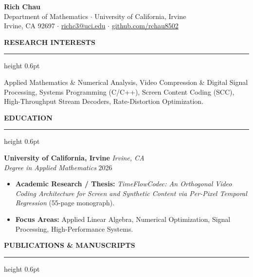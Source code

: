 \documentclass[11pt,letterpaper]{article}
\newcommand{\cvsection}[1]{%
  \vspace{10pt}%
  {\noindent\large\bfseries\MakeUppercase{#1}}\\[-2pt]%
  \hrule height 0.6pt%
  \vspace{5pt}%
}
\newcommand{\cventry}[4]{%
  \textbf{#1} \hfill \textit{#2} \\
  \textit{#3} \hfill #4 \\
}
\begin{document}
\begin{center}
    {\Huge \textbf{Rich Chau}} \\[6pt]
    Department of Mathematics $\cdot$ University of California, Irvine \\
    Irvine, CA 92697 $\cdot$ \href{mailto:richc3@uci.edu}{richc3@uci.edu} $\cdot$ \href{https://github.com/rchau8502}{github.com/rchau8502}
\end{center}

\vspace{4pt}

\cvsection{Research Interests}
Applied Mathematics \& Numerical Analysis, Video Compression \& Digital Signal Processing, Systems Programming (C/C++), Screen Content Coding (SCC), High-Throughput Stream Decoders, Rate-Distortion Optimization.

\cvsection{Education}

\cventry{University of California, Irvine}{Irvine, CA}{Degree in Applied Mathematics}{2026}
\begin{itemize}
    \setlength{\itemsep}{1pt}
    \setlength{\parskip}{0pt}
    \setlength{\parsep}{0pt}
    \item \textbf{Academic Research / Thesis:} \textit{TimeFlowCodec: An Orthogonal Video Coding Architecture for Screen and Synthetic Content via Per-Pixel Temporal Regression} (55-page monograph).
    \item \textbf{Focus Areas:} Applied Linear Algebra, Numerical Optimization, Signal Processing, High-Performance Systems.
\end{itemize}

\cvsection{Publications \& Manuscripts}
\end{document}
